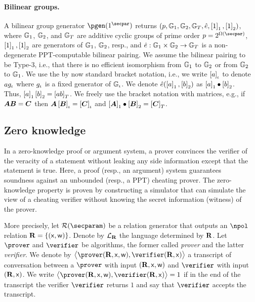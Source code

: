 \documentclass[runningheads,11pt]{llncs}
\let\spvec\vec
\let\vec\accentvec
\let\vec\spvec
\def\vec#1{\mathchoice{\mbox{\boldmath$\displaystyle#1$}}
	{\mbox{\boldmath$\textstyle#1$}}
	{\mbox{\boldmath$\scriptstyle#1$}}
	{\mbox{\boldmath$\scriptscriptstyle#1$}}}
\theoremstyle{definition}
\begin{document}
\paragraph{Bilinear groups.}
A bilinear group generator $\pgen (1^\secpar)$ returns $(p, \mathbb{G}_1, \mathbb{G}_2, \mathbb{G}_T, \hat{e}, \left[1\right]_{1}, \left[1\right]_{2})$, where $\mathbb{G}_1$, $\mathbb{G}_2$, and $\mathbb{G}_T$ are additive cyclic groups of prime order $p = 2^{\Omega (\secpar)}$, $\left[1\right]_{1}, \left[1\right]_{2}$ are generators of $\mathbb{G}_1$, $\mathbb{G}_2$, resp., and $\hat{e}: \mathbb{G}_1 \times \mathbb{G}_2 \to \mathbb{G}_T$ is a non-degenerate PPT-computable bilinear pairing.
We assume the bilinear pairing to be Type-3, i.e., that there is no efficient isomorphism from $\mathbb{G}_1$ to $\mathbb{G}_2$ or from $\mathbb{G}_2$ to $\mathbb{G}_1$.
We use the by now standard bracket notation, i.e., we write $\left[a\right]_{\iota}$ to denote $a g_{\iota}$ where $g_{\iota}$ is a fixed generator of $\mathbb{G}_{\iota}$.
We denote $\hat{e} (\left[a\right]_{1}, \left[b\right]_{2})$ as $\left[a\right]_{1} \bullet \left[b\right]_{2}$.
Thus, $\left[a\right]_{1} \left[b\right]_{2} = \left[a b\right]_{T}$.
We freely use the bracket notation with matrices, e.g., if $\vec{A} \vec{B} = \vec{C}$ then $\vec{A} \grpgi{\vec{B}} = \grpgi{\vec{C}}$ and $\gone{\vec{A}}\bullet \gtwo{\vec{B}} = \gtar{\vec{C}}$.

\subsection{Zero knowledge}
In a zero-knowledge proof or argument system, a prover convinces the verifier of the veracity of a statement without leaking any side information except that the statement is true.
Here, a proof (resp., an argument) system guarantees soundness against an unbounded (resp., a PPT) cheating prover.
The zero-knowledge property is proven by constructing a simulator that can simulate the view of a cheating verifier without knowing the secret information (witness) of the prover.

More precisely, let $\RELGEN(\secparam)$ be a relation generator that outputs an $\npol$ relation $\mathbf{R} = \{(\mathsf{x}, \mathsf{w})\}$. Denote by $\mathcal{L}_{\mathbf{R}}$ the language determined by $\mathbf{R}$.
Let $\prover$ and $\verifier$ be algorithms, the former called \emph{prover} and the latter \emph{verifier}.
We denote by $\ip{\prover(\REL, \inp, \wit)}{\verifier(\REL, \inp)}$ a transcript of conversation between a $\prover$ with input $(\mathbf{R}, \mathsf{x}, \mathsf{w})$ and $\verifier$ with input $(\mathbf{R}, \mathsf{x})$.
We write $\ip{\prover (\REL, \inp, \wit)}{\verifier(\REL, \inp)} = 1$ if in the end of the transcript the verifier $\verifier$ returns $1$ and say that $\verifier$ accepts the transcript.
\end{document}
